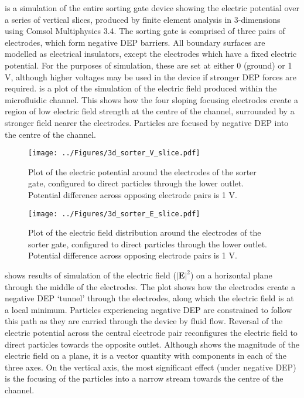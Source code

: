  is a simulation of the entire sorting gate device showing the electric potential over a series of vertical slices, produced by finite element analysis in 3-dimensions using Comsol Multiphysics 3.4. The sorting gate is comprised of three pairs of electrodes, which form negative DEP barriers. All boundary surfaces are modelled as electrical insulators, except the electrodes which have a fixed electric potential. For the purposes of simulation, these are set at either 0 (ground) or 1 V, although higher voltages may be used in the device if stronger DEP forces are required.  is a plot of the simulation of the electric field produced within the microfluidic channel. This shows how the four sloping focusing electrodes create a region of low electric field strength at the centre of the channel, surrounded by a stronger field nearer the electrodes. Particles are focused by negative DEP into the centre of the channel.

\begin{figure}[p]
 \centering
 \texttt{[image: ../Figures/3d\_sorter\_V\_slice.pdf]}
 \caption[Simulation of the electric potential within the sorting gate.]{Plot of the electric potential around the electrodes of the sorter gate, configured to direct particles through the lower outlet. Potential difference across opposing electrode pairs is 1 V.}
 \label{fig:3d_sorter_V_slice}
\end{figure}

\begin{figure}[p]
 \centering
 \texttt{[image: ../Figures/3d\_sorter\_E\_slice.pdf]}
 \caption[Simulation of the electric field distribution within the sorting gate.]{Plot of the electric field distribution around the electrodes of the sorter gate, configured to direct particles through the lower outlet. Potential difference across opposing electrode pairs is 1 V.}
 \label{fig:3d_sorter_E_slice}
\end{figure}

 shows results of simulation of the electric field ($\left | \textbf{E} \right | ^{2}$) on a horizontal plane through the middle of the electrodes. The plot shows how the electrodes create a negative DEP `tunnel' through the electrodes, along which the electric field is at a local minimum. Particles experiencing negative DEP are constrained to follow this path as they are carried through the device by fluid flow. Reversal of the electric potential across the central electrode pair reconfigures the electric field to direct particles towards the opposite outlet. Although  shows the magnitude of the electric field on a plane, it is a vector quantity with components in each of the three axes. On the vertical axis, the most significant effect (under negative DEP) is the focusing of the particles into a narrow stream towards the centre of the channel.

